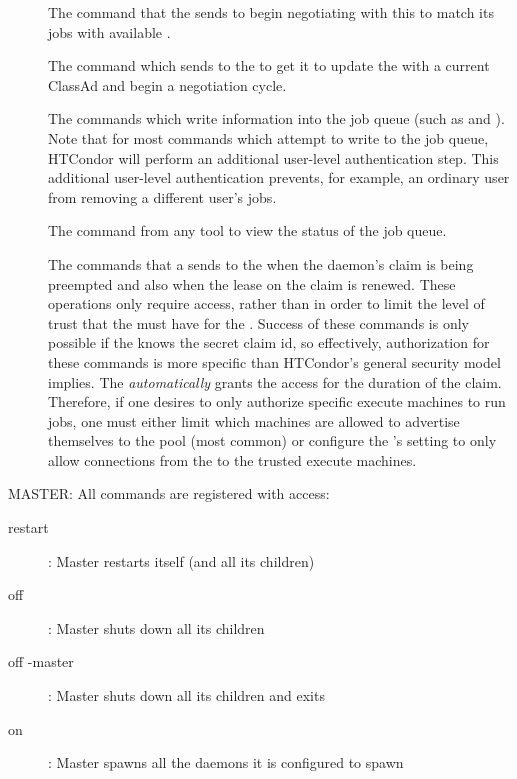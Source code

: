 \begin{description}
\item[]
The command that the  sends to
  begin negotiating with this  to match its jobs with available
  .

\item[]
The command which  sends to
  the  to get it to update the  with a current ClassAd
  and begin a negotiation cycle.

  The commands which write information into the job queue (such as
   and ).  
  Note that for most commands which attempt to write to the job queue, HTCondor
  will perform an additional user-level authentication step.  
  This additional user-level authentication prevents, for example, an
  ordinary user from removing a different user's jobs.

\item[]
The command from any
  tool to view the status of the job queue.  

 The commands that a  sends to the  when
 the  daemon's claim is being preempted and also when the
 lease on the claim is renewed.  These operations only require
  access, rather than  in order to
 limit the level of trust that the  must have for the
 .  Success of these commands is only possible if the
  knows the secret claim id, so effectively, authorization for
 these commands is more specific than HTCondor's general security model
 implies.  The  \emph{automatically} grants the
   access for the duration of the claim.
 Therefore, if one desires to only authorize specific execute
 machines to run jobs, one must either limit which machines are
 allowed to advertise themselves to the pool (most common) or
 configure the 's  setting to only
 allow connections from the  to the trusted execute machines.

\end{description}

MASTER:  All commands are registered with 
access:

\begin{description}
\item[restart] : Master restarts itself (and all its children)	
\item[off] : Master shuts down all its children
\item[off -master] : Master shuts down all its children and exits
\item[on] : Master spawns all the daemons it is configured to spawn
\end{description}

